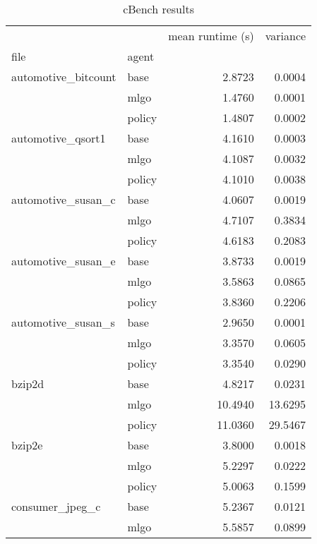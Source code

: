 \begin{table*}
\caption{cBench results}
\label{table:cBench}
\begin{tabular}[t]{llrr}
\toprule
                &        &  mean runtime (s) &  variance \\
file & agent &               &           \\
\midrule
automotive\_bitcount & base &        2.8723 &    0.0004 \\
                & mlgo &        1.4760 &    0.0001 \\
                & policy &        1.4807 &    0.0002 \\
automotive\_qsort1 & base &        4.1610 &    0.0003 \\
                & mlgo &        4.1087 &    0.0032 \\
                & policy &        4.1010 &    0.0038 \\
automotive\_susan\_c & base &        4.0607 &    0.0019 \\
                & mlgo &        4.7107 &    0.3834 \\
                & policy &        4.6183 &    0.2083 \\
automotive\_susan\_e & base &        3.8733 &    0.0019 \\
                & mlgo &        3.5863 &    0.0865 \\
                & policy &        3.8360 &    0.2206 \\
automotive\_susan\_s & base &        2.9650 &    0.0001 \\
                & mlgo &        3.3570 &    0.0605 \\
                & policy &        3.3540 &    0.0290 \\
bzip2d & base &        4.8217 &    0.0231 \\
                & mlgo &       10.4940 &   13.6295 \\
                & policy &       11.0360 &   29.5467 \\
bzip2e & base &        3.8000 &    0.0018 \\
                & mlgo &        5.2297 &    0.0222 \\
                & policy &        5.0063 &    0.1599 \\
consumer\_jpeg\_c & base &        5.2367 &    0.0121 \\
                & mlgo &        5.5857 &    0.0899 \\

\end{tabular}
\end{table*}
